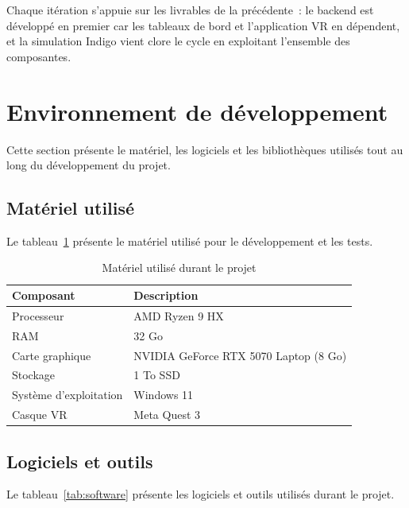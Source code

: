 Chaque itération s'appuie sur les livrables de la précédente~: le backend est développé
en premier car les tableaux de bord et l'application VR en dépendent, et la simulation
Indigo vient clore le cycle en exploitant l'ensemble des composantes.

\section{Environnement de développement}

Cette section présente le matériel, les logiciels et les bibliothèques utilisés tout
au long du développement du projet.

\subsection{Matériel utilisé}

Le tableau~\ref{tab:hardware} présente le matériel utilisé pour le développement et les tests.

\begin{table}[H]
  \centering
  \begin{tabular}{ll}
    \toprule
    \textbf{Composant} & \textbf{Description} \\
    \midrule
    Processeur       & AMD Ryzen 9 HX \\
    RAM              & 32 Go \\
    Carte graphique  & NVIDIA GeForce RTX 5070 Laptop (8 Go) \\
    Stockage         & 1 To SSD \\
    Système d'exploitation & Windows 11 \\
    Casque VR        & Meta Quest 3 \\
    \bottomrule
  \end{tabular}
  \caption{Matériel utilisé durant le projet}
  \label{tab:hardware}
\end{table}

\subsection{Logiciels et outils}

Le tableau~\ref{tab:software} présente les logiciels et outils utilisés durant le projet.

